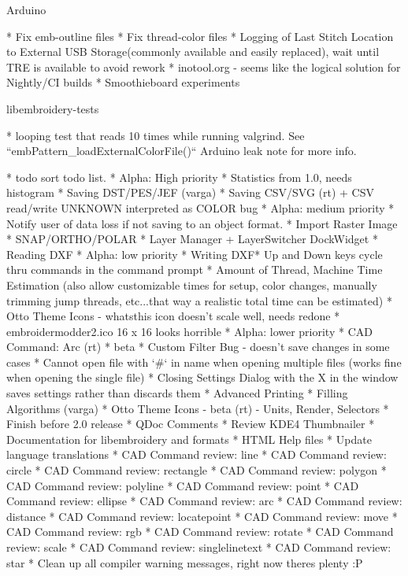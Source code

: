 \documentclass[a4paper]{report}
\begin{document}
{Arduino
~~~~~~~

* Fix emb-outline files
* Fix thread-color files
* Logging of Last Stitch Location to External USB Storage(commonly available and easily replaced), wait until TRE is available to avoid rework
* inotool.org - seems like the logical solution for Nightly/CI builds
* Smoothieboard experiments

libembroidery-tests
~~~~~~~~~~~~~~~~~~~

* looping test that reads 10 times while running valgrind. See ``embPattern_loadExternalColorFile()`` Arduino leak note for more info.

* todo sort todo list.
* Alpha: High priority
  * Statistics from 1.0, needs histogram
  * Saving DST/PES/JEF (varga)
  * Saving CSV/SVG (rt) + CSV read/write UNKNOWN interpreted as COLOR bug
* Alpha: medium priority
  * Notify user of data loss if not saving to an object format.
  * Import Raster Image
  * SNAP/ORTHO/POLAR
  * Layer Manager + LayerSwitcher DockWidget
  * Reading DXF
* Alpha: low priority
  * Writing DXF* Up and Down keys cycle thru commands in the command prompt
  * Amount of Thread, Machine Time Estimation (also allow customizable times for setup, color changes, manually trimming jump threads, etc...that way a realistic total time can be estimated)
  * Otto Theme Icons - whatsthis icon doesn't scale well, needs redone
  * embroidermodder2.ico 16 x 16 looks horrible
* Alpha: lower priority
  * CAD Command: Arc (rt)
* beta
  * Custom Filter Bug - doesn't save changes in some cases
  * Cannot open file with `\#` in name when opening multiple files (works fine when opening the single file)
  * Closing Settings Dialog with the X in the window saves settings rather than discards them
  * Advanced Printing
  * Filling Algorithms (varga)
  * Otto Theme Icons - beta (rt) - Units, Render, Selectors
* Finish before 2.0 release
  * QDoc Comments
  * Review KDE4 Thumbnailer
  * Documentation for libembroidery and formats
  * HTML Help files
  * Update language translations
  * CAD Command review: line
  * CAD Command review: circle
  * CAD Command review: rectangle
  * CAD Command review: polygon
  * CAD Command review: polyline
  * CAD Command review: point
  * CAD Command review: ellipse
  * CAD Command review: arc
  * CAD Command review: distance
  * CAD Command review: locatepoint
  * CAD Command review: move
  * CAD Command review: rgb
  * CAD Command review: rotate
  * CAD Command review: scale
  * CAD Command review: singlelinetext
  * CAD Command review: star
  * Clean up all compiler warning messages, right now theres plenty :P
}
\end{document}
